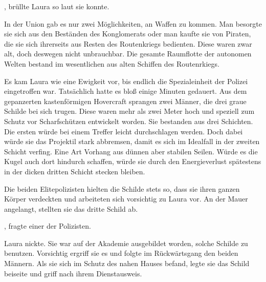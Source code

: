 \par

, brüllte Laura so laut sie konnte. 

\par

In der Union gab es nur zwei Möglichkeiten, an Waffen zu kommen. Man besorgte sie sich aus den Beständen des Konglomerats oder man kaufte sie von Piraten, die sie sich ihrerseits aus Resten des Routenkriegs bedienten. Diese waren zwar alt, doch deswegen nicht unbrauchbar. Die gesamte Raumflotte der autonomen Welten bestand im wesentlichen aus alten Schiffen des Routenrkiegs.

\par

Es kam Laura wie eine Ewigkeit vor, bis endlich die Spezialeinheit der Polizei eingetroffen war. Tatsächlich hatte es bloß einige Minuten gedauert. Aus dem gepanzerten kastenförmigen Hovercraft sprangen zwei Männer, die drei graue Schilde bei sich trugen. Diese waren mehr als zwei Meter hoch und speziell zum Schutz vor Scharfschützen entwickelt worden. Sie bestanden aus drei Schichten. Die ersten würde bei einem Treffer leicht durchschlagen werden. Doch dabei würde sie das Projektil stark abbremsen, damit es sich im Idealfall in der zweiten Schicht verfing. Eine Art Vorhang aus dünnen aber stabilen Seilen. Würde es die Kugel auch dort hindurch schaffen, würde sie durch den Energieverlust spätestens in der dicken dritten Schicht stecken bleiben.

\par

Die beiden Elitepolizisten hielten die Schilde stets so, dass sie ihren ganzen Körper verdeckten und arbeiteten sich vorsichtig zu Laura vor. An der Mauer angelangt, stellten sie das dritte Schild ab.

\par

, fragte einer der Polizisten.

\par

Laura nickte. Sie war auf der Akademie ausgebildet worden, solche Schilde zu benutzen. Vorsichtig ergriff sie es und folgte im Rückwärtsgang den beiden Männern. Als sie sich im Schutz des nahen Hauses befand, legte sie das Schild beiseite und griff nach ihrem Dienstausweis.

\par

